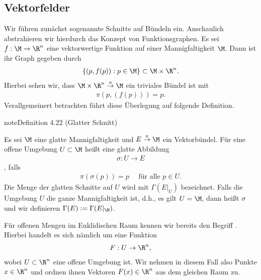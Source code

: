 \documentclass[letterpaper,10pt,english]{jupyterBook}
\begin{document}
\subsection{Vektorfelder}
\label{\detokenize{manifolds/tangential:vektorfelder}}
\sphinxAtStartPar
Wir führen zunächst sogenannte Schnitte auf Bündeln ein.
Anschaulich abstrahieren wir hierdurch das Konzept von Funktionsgraphen.
Es sei \(f:\M\to\R^n\) eine vektorwertige Funktion auf einer Mannigfaltigkeit \(\M\).
Dann ist ihr Graph gegeben durch
\begin{equation*}
\begin{split}\{(p,f(p)): p\in\M\}\subset \M\times\R^n.\end{split}
\end{equation*}
\sphinxAtStartPar
Hierbei sehen wir, dass \(\M\times\R^n\overset{\pi}{\to}\M\) ein triviales Bündel ist mit
\begin{equation*}
\begin{split}\pi(p,(f(p))) = p.\end{split}
\end{equation*}
\sphinxAtStartPar
Verallgemeinert betrachten führt diese Überlegung auf folgende Definition.
\label{manifolds/tangential:definition-29}
\begin{sphinxadmonition}{note}{Definition 4.22 (Glatter Schnitt)}



\sphinxAtStartPar
Es sei \(\M\) eine glatte Mannigfaltigkeit und \(E\overset{\pi}{\to}\M\) ein Vektorbündel.
Für eine offene Umgebung \(U\subset\M\) heißt eine glatte Abbildung
\begin{equation*}
\begin{split}\sigma: U\to E\end{split}
\end{equation*}
\sphinxAtStartPar
{}, falls
\begin{equation*}
\begin{split}\pi(\sigma(p)) = p\quad\text{ für alle }p\in U.\end{split}
\end{equation*}
\sphinxAtStartPar
Die Menge der glatten Schnitte auf \(U\) wird mit \(\Gamma(E\rvert_U)\) bezeichnet.
Falls die Umgebung \(U\) die ganze Mannigfaltigkeit ist, d.h., es gilt \(U=\M\), dann heißt \(\sigma\)  und wir definieren \(\Gamma(E):=\Gamma(E\rvert_\M)\).
\end{sphinxadmonition}

\sphinxAtStartPar
Für offenen Mengen im Euklidischen Raum kennen wir bereits den Begriff .
Hierbei handelt es sich nämlich um eine Funktion
\begin{equation*}
\begin{split}F:U\to\R^n,\end{split}
\end{equation*}
\sphinxAtStartPar
wobei \(U\subset\R^n\) eine offene Umgebung ist.
Wir nehmen in diesem Fall also Punkte \(x\in\R^n\) und ordnen ihnen Vektoren \(F(x)\in\R^n\) aus dem gleichen Raum zu.
\end{document}
